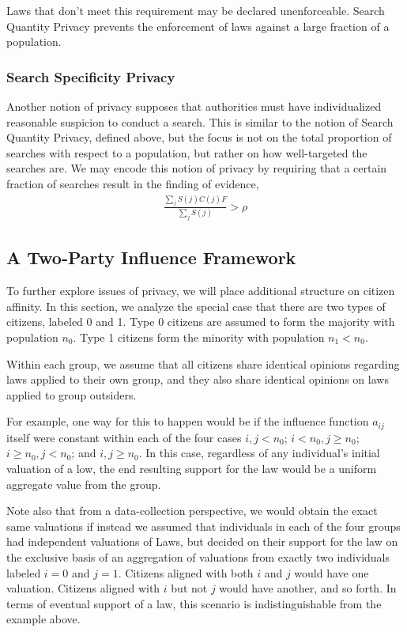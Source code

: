 Laws that don't meet this requirement may be declared unenforceable.  Search Quantity Privacy prevents the enforcement of laws against a large fraction of a population.


\subsubsection{Search Specificity Privacy}

Another notion of privacy supposes that authorities must have individualized reasonable suspicion to conduct a search.  This is similar to the notion of Search Quantity Privacy, defined above, but the focus is not on the total proportion of searches with respect to a population, but rather on how well-targeted the searches are.  We may encode this notion of privacy by requiring that a certain fraction of searches result in the finding of evidence,
\begin{align}
\frac{\sum_j S(j)C(j)F}{\sum_j S(j)} > \rho
\end{align}



\subsection{A Two-Party Influence Framework}

To further explore issues of privacy, we will place additional structure on citizen affinity.  In this section, we analyze the special case that there are two types of citizens, labeled 0 and 1.  Type 0 citizens are assumed to form the majority with population $n_0$.  Type 1 citizens form the minority with population $n_1 < n_0$.  

Within each group, we assume that all citizens share identical opinions regarding laws applied to their own group, and they also share identical opinions on laws applied to group outsiders. 

For example, one way for this to happen would be if the influence function $a_{ij}$ itself were constant within each of the four cases $i,j<n_0$; $i<n_0,j\geq n_0$; $i\geq n_0,j < n_0$; and $i,j\geq n_0$. In this case, regardless of any individual's initial valuation of a low, the end resulting support for the law would be a uniform  aggregate value from the group.  

Note also that from a data-collection perspective, we would obtain the exact same valuations if instead we assumed that individuals in each of the four groups had independent valuations of Laws, but decided on their support for the law on the exclusive basis of an aggregation of valuations from exactly two individuals labeled $i=0$ and $j=1$.  Citizens aligned with both $i$ and $j$ would have one valuation.  Citizens aligned with $i$ but not $j$ would have another, and so forth.  In terms of eventual support of a law, this scenario is indistinguishable from the example above.

